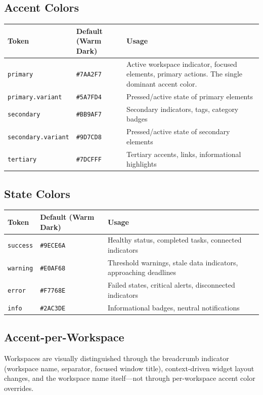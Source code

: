 \documentclass[11pt,a4paper]{article}
\begin{document}
\subsection{Accent Colors}

\begin{longtable}{p{3.5cm} p{3cm} p{7cm}}
\toprule
\textbf{Token} & \textbf{Default (Warm Dark)} & \textbf{Usage} \\
\midrule
\texttt{primary} & \texttt{\#7AA2F7} & Active workspace indicator, focused elements, primary actions. The single dominant accent color. \\
\texttt{primary.variant} & \texttt{\#5A7FD4} & Pressed/active state of primary elements \\
\texttt{secondary} & \texttt{\#BB9AF7} & Secondary indicators, tags, category badges \\
\texttt{secondary.variant} & \texttt{\#9D7CD8} & Pressed/active state of secondary elements \\
\texttt{tertiary} & \texttt{\#7DCFFF} & Tertiary accents, links, informational highlights \\
\bottomrule
\end{longtable}

\subsection{State Colors}

\begin{longtable}{p{3.5cm} p{3cm} p{7cm}}
\toprule
\textbf{Token} & \textbf{Default (Warm Dark)} & \textbf{Usage} \\
\midrule
\texttt{success} & \texttt{\#9ECE6A} & Healthy status, completed tasks, connected indicators \\
\texttt{warning} & \texttt{\#E0AF68} & Threshold warnings, stale data indicators, approaching deadlines \\
\texttt{error} & \texttt{\#F7768E} & Failed states, critical alerts, disconnected indicators \\
\texttt{info} & \texttt{\#2AC3DE} & Informational badges, neutral notifications \\
\bottomrule
\end{longtable}

\subsection{Accent-per-Workspace}

Workspaces are visually distinguished through the breadcrumb indicator (workspace name, separator, focused window title), context-driven widget layout changes, and the workspace name itself---not through per-workspace accent color overrides.
\end{document}
